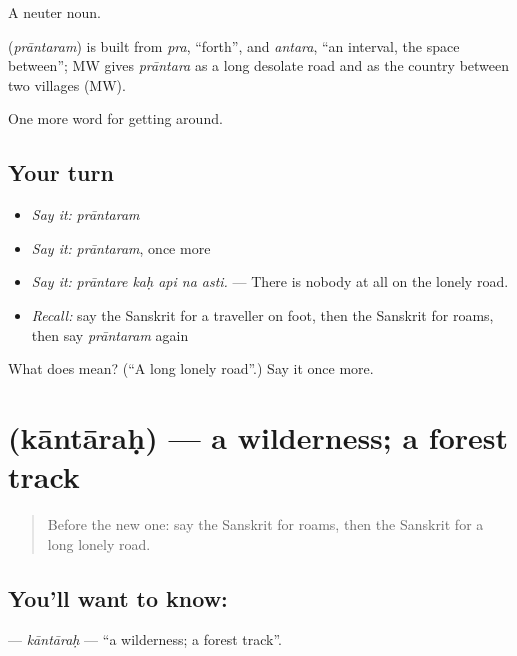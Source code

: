A neuter noun.

\begin{cousinweb}
\textbf{} (\emph{prāntaram}) is built from \emph{pra}, \textquotedblleft{}forth\textquotedblright{}, and \emph{antara}, \textquotedblleft{}an interval, the space between\textquotedblright{}; MW gives \emph{prāntara} as a long desolate road and as the country between two villages (MW).
\end{cousinweb}

\begin{grammarlens}[title={What you've built}]
One more word for getting around.
\end{grammarlens}

\subsection*{Your turn}
\begin{itemize}
\raggedright
  \item \emph{Say it:} \emph{prāntaram}
  \item \emph{Say it:} \emph{prāntaram}, once more
  \item \emph{Say it:} \emph{prāntare kaḥ api na asti.} — There is nobody at all on the lonely road.
  \item \emph{Recall:} say the Sanskrit for a traveller on foot, then the Sanskrit for roams, then say \emph{prāntaram} again
\end{itemize}

\begin{tcolorbox}[breakable,colback=teal!4,colframe=teal!35!black,title={Before you move on}]
What does  mean? (\textquotedblleft{}A long lonely road\textquotedblright{}.) Say it once more.
\end{tcolorbox}
\section[\texorpdfstring{\sk{कान्तारः} (kāntāraḥ)}{कान्तारः (kāntāraḥ)}]{ (kāntāraḥ) — a wilderness; a forest track}

\label{lesson:SA-C404-kantarah}



\begin{quote}
Before the new one: say the Sanskrit for roams, then the Sanskrit for a long lonely road.
\end{quote}

\subsection*{You'll want to know: }
\textbf{} — \emph{kāntāraḥ} — \textquotedblleft{}a wilderness; a forest track\textquotedblright{}.

